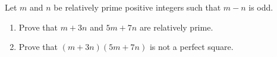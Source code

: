 Let $m$ and $n$ be relatively prime positive integers such that $m-n$ is odd.
\begin{enumerate}
\item[(a)] Prove that $m+3n$ and $5m+7n$ are relatively prime.
\item[(b)] Prove that $(m+3n)(5m+7n)$ is not a perfect square.
\end{enumerate}
